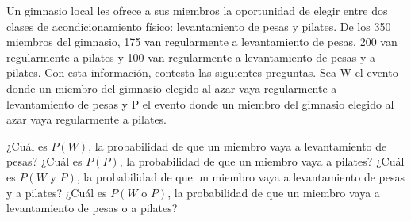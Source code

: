 Un gimnasio local les ofrece a sus miembros la oportunidad de elegir entre dos clases de
acondicionamiento físico: levantamiento de pesas y pilates. De los 350 miembros del gimnasio, 175 van regularmente
a levantamiento de pesas, 200 van regularmente a pilates y 100 van regularmente a levantamiento de pesas
y a pilates. Con esta información, contesta las siguientes preguntas.
Sea W el evento donde un miembro del gimnasio elegido al azar vaya regularmente a levantamiento de pesas y P
el evento donde un miembro del gimnasio elegido al azar vaya regularmente a pilates.
\begin{parts}
    ¿Cuál es $P(W)$, la probabilidad de que un miembro vaya a levantamiento de pesas?                                \fillin[175/350]
    ¿Cuál es $P(P)$, la probabilidad de que un miembro vaya a pilates?                                               \fillin[200/350]
    ¿Cuál es $P(W\text{ y }P)$, la probabilidad de que un miembro vaya a levantamiento de pesas y a pilates? \fillin[100/350]
    ¿Cuál es $P(W\text{ o }P)$, la probabilidad de que un miembro vaya a levantamiento de pesas o a pilates? \fillin[275/350]
\end{parts}
